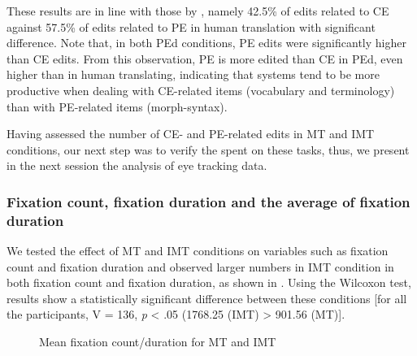 \documentclass[output=paper]{langsci/langscibook}
\begin{document}
These results are in line with those by \citet{alves2013}, namely 42.5\% of edits related to CE against 57.5\% of edits related to PE in human translation with significant difference. Note that, in both PEd conditions, PE edits were significantly higher than CE edits. From this observation, PE is more edited than CE in PEd, even higher than in human translating, indicating that  systems tend to be more productive when dealing with CE-related items (vocabulary and terminology) than with PE-related items (morph-syntax).  


\largerpage
Having assessed the number of CE- and PE-related edits in MT and IMT conditions, our next step was to verify the  spent on these  tasks, thus, we present in the next session the analysis of eye tracking data.


\subsubsection{Fixation count, fixation duration and the average of fixation duration\label{alves:sec:FixationCount}}

\largerpage[2]
We tested the effect of MT and IMT conditions on variables such as fixation count and fixation duration and observed larger numbers in IMT condition in both fixation count and fixation duration, as shown in . Using the Wilcoxon test, results show a statistically significant difference between these conditions [for all the participants, V = 136, \textit{p} < .05 (1768.25 (IMT) {\textgreater} 901.56 (MT)].


\begin{figure}
 \caption{Mean fixation count/duration for MT and IMT%
}
 \label{sarto:fig:6}
\end{figure} 
\end{document}
